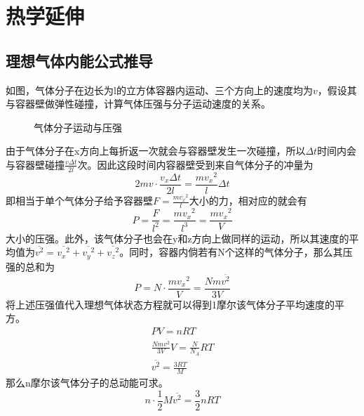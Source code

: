 \section{热学延伸}

\subsection{理想气体内能公式推导}

如图，气体分子在边长为l的立方体容器内运动、三个方向上的速度均为$v$，假设其与容器壁做弹性碰撞，计算气体压强与分子运动速度的关系。
\begin{figure}[ht!]
    \centering
    \caption{气体分子运动与压强}
\end{figure}
由于气体分子在x方向上每折返一次就会与容器壁发生一次碰撞，所以$\Delta t$时间内会与容器壁碰撞$\frac{v\Delta t}{2l}$次。因此这段时间内容器壁受到来自气体分子的冲量为
\begin{equation*}
    2mv\cdot\frac{v_x\Delta t}{2l}=\frac{m{v_x}^2}{l}\Delta t
\end{equation*}
即相当于单个气体分子给予容器壁$F=\frac{m{v_x}^2}{l}$大小的力，相对应的就会有
\begin{equation*}
    P=\frac{F}{l^2}=\frac{m{v_x}^2}{l^3}=\frac{m{v_x}^2}{V}
\end{equation*}
大小的压强。此外，该气体分子也会在y和z方向上做同样的运动，所以其速度的平均值为$\overline{v^2}=\overline{{v_x}^2}+\overline{{v_y}^2}+\overline{{v_z}^2}$。同时，容器内倘若有N个这样的气体分子，那么其压强的总和为
\begin{equation*}
    P=N\cdot\frac{m{v_x}^2}{V}=\frac{Nm\overline{v^2}}{3V}
\end{equation*}
将上述压强值代入理想气体状态方程就可以得到1摩尔该气体分子平均速度的平方。
\begin{gather*}
    PV=nRT\\
    \frac{Nm\overline{v^2}}{3V}V=\frac{N}{N_A}RT\\
    \overline{v^2}=\frac{3RT}{M}
\end{gather*}
那么n摩尔该气体分子的总动能可求。
\begin{equation*}
    n\cdot\frac12M\overline{v^2}=\frac32nRT
\end{equation*}

